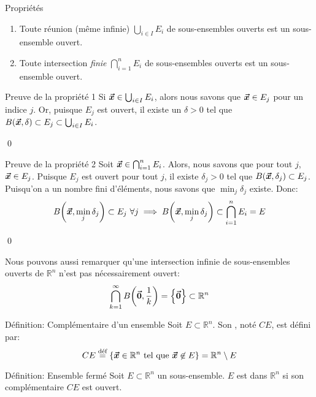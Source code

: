 \documentclass[a4paper]{article}
\begin{document}
\begin{parag}{Propriétés}
    \begin{enumerate}[left=0pt]
        \item Toute réunion (même infinie) $\bigcup_{i \in I} E_i$ de sous-ensembles ouverts est un sous-ensemble ouvert. 
        \item Toute intersection \textit{finie} $\bigcap_{i=1}^n E_i$ de sous-ensembles ouverts est un sous-ensemble ouvert. 
    \end{enumerate}

    \begin{subparag}{Preuve de la propriété 1}
        Si $\bm{\protect\vec{x}} \in \bigcup_{i \in I} E_i$, alors nous savons que $\bm{\protect\vec{x}} \in E_j$ pour un indice $j$. Or, puisque $E_j$ est ouvert, il existe un $\delta > 0$ tel que $B\left(\bvec{x}, \delta\right) \subset E_j \subset \bigcup_{i \in I} E_i$.

        \qed
    \end{subparag}
    
    \begin{subparag}{Preuve de la propriété 2}
            Soit $\bm{\protect\vec{x}} \in \bigcap_{i=1}^n E_i$. Alors, nous savons que pour tout $j$, $\bm{\protect\vec{x}} \in E_j$. Puisque $E_j$ est ouvert pour tout $j$, il existe $\delta_j > 0$ tel que $B\left(\bvec{x}, \delta_j\right) \subset E_j$. Puisqu'on a un nombre fini d'éléments, nous savons que $\min_j \delta_j$ existe. Donc: 
            \[B\left(\bvec{x}, \min_j \delta_j\right) \subset E_j\ \forall j \implies B\left(\bvec{x}, \min_j \delta_j\right) \subset \bigcap_{i=1}^n E_i = E\]

            \qed


            Nous pouvons aussi remarquer qu'une intersection infinie de sous-ensembles ouverts de $\mathbb{R}^n$ n'est pas nécessairement ouvert: 
            \[\bigcap_{k=1}^{\infty} B\left(\bvec{0}, \frac{1}{k}\right) = \left\{\bvec{0}\right\} \subset \mathbb{R}^n\]
    \end{subparag}
\end{parag}

\begin{parag}{Définition: Complémentaire d'un ensemble}
    Soit $E \subset \mathbb{R}^n$. Son , noté $CE$, est défini par: 
    \[CE \over{=}{déf} \left\{\bvec{x} \in \mathbb{R}^n \telque \bvec{x} \not\in E\right\} = \mathbb{R}^n \setminus E\]
\end{parag}


\begin{parag}{Définition: Ensemble fermé}
    Soit $E \subset \mathbb{R}^n$ un sous-ensemble. $E$ est  dans $\mathbb{R}^n$ si son complémentaire $CE$ est ouvert.
\end{parag}
\end{document}
